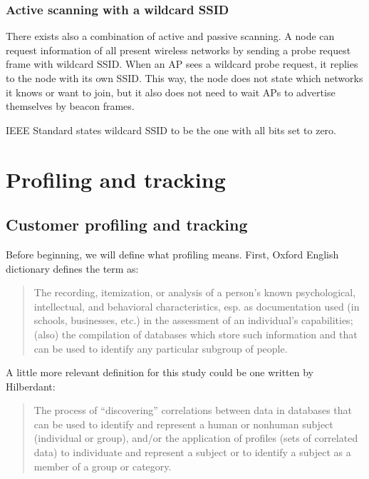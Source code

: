 \documentclass[12pt,a4paper,oneside,pdftex]{report}
\begin{document}
\subsection{Active scanning with a wildcard SSID}
\label{subsec:active_wildcard}

There exists also a combination of active and passive scanning. A node can request information of all present wireless networks by sending a probe request frame with wildcard SSID. When an AP sees a wildcard probe request, it replies to the node with its own SSID. This way, the node does not state which networks it knows or want to join, but it also does not need to wait APs to advertise themselves by beacon frames. 

IEEE Standard states wildcard SSID to be the one with all bits set to zero. 




\chapter{Profiling and tracking}
\label{chapter:profiling}

\section{Customer profiling and tracking}
\label{sec:profiling}

Before beginning, we will define what profiling means. First, Oxford English dictionary defines the term as:~\cite{oed_profiling}

\begin{quote}
The recording, itemization, or analysis of a person's known psychological, intellectual, and behavioral characteristics, esp. as documentation used (in schools, businesses, etc.) in the assessment of an individual's capabilities; (also) the compilation of databases which store such information and that can be used to identify any particular subgroup of people.
\end{quote}

A little more relevant definition for this study could be one written by Hilberdant:~\cite{hildebrandt2008}

\begin{quote}
The process of ``discovering'' correlations between data in databases that can be used to identify and represent a human or nonhuman subject (individual or group), and/or the application of profiles (sets of correlated data) to individuate and represent a subject or to identify a subject as a member of a group or category.
\end{quote}
\end{document}
